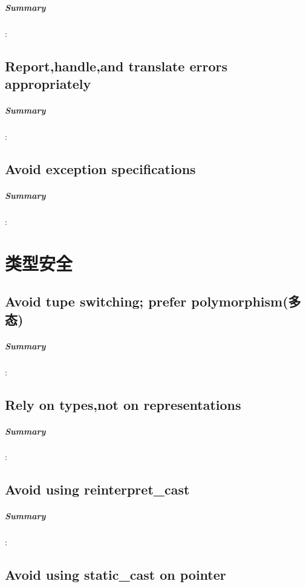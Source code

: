 \documentclass[UTF8,a4paper,12pt]{ctexbook}
\begin{document}
		\paragraph{Summary}:
	
	
	\section{Report,handle,and translate errors appropriately}
		\paragraph{Summary}:
		
		
	\section{Avoid exception specifications}
		\paragraph{Summary}:
	
\chapter{类型安全}
	\section{Avoid tupe switching; prefer polymorphism(多态)}
		\paragraph{Summary}:
		
		
	\section{Rely on types,not on representations}
		\paragraph{Summary}:
		
		
	\section{Avoid using reinterpret\_cast}
		\paragraph{Summary}:
		
		
	\section{Avoid using static\_cast on pointer}
\end{document}
